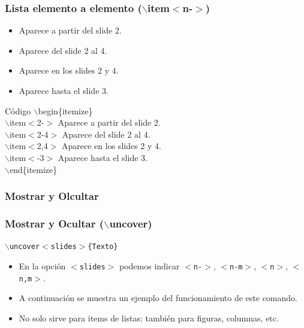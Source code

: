 \documentclass[aspectratio=1610]{beamer}%
\begin{document}
\begin{frame}[fragile]
\frametitle{\textbf{Lista elemento a elemento ($\backslash$item$<$n-$>$)}}
\justifying
 \begin{itemize}
\item<2-> Aparece a partir del slide 2.
 \item<2-4> Aparece del slide 2 al 4. 
 \item<2,4> Aparece en los slides 2 y 4. 
 \item<-3> Aparece hasta el slide 3. 
\end{itemize}  
 
\begin{exampleblock}{Código}
$\backslash$begin\{itemize\}\\
$\backslash$item$<$2-$>$ Aparece a partir del slide 2.\\
 $\backslash$item$<$2-4$>$ Aparece del slide 2 al 4. \\
 $\backslash$item$<$2,4$>$ Aparece en los slides 2 y 4.\\ 
$\backslash$item$<$-3$>$ Aparece hasta el slide 3. \\
$\backslash$end\{itemize\}    
\end{exampleblock}


\end{frame}

\subsubsection{Mostrar y Olcultar}
\begin{frame}[fragile]
\frametitle{\textbf{Mostrar y Ocultar ($\backslash$uncover)}}
\justifying
 \texttt{$\backslash$uncover$<$slides$>$\{Texto\}}
 \begin{itemize}\justifying
  \item En la opción \texttt{$<$slides$>$} podemos indicar \texttt{$<$n-$>$}, \texttt{$<$n-m$>$}, \texttt{$<$n$>$}, \texttt{$<$n,m$>$}.
  \item A continuación se muestra un ejemplo del funcionamiento de este comando.
  \item No solo sirve para items de listas: también para figuras, columnas, etc.
\end{itemize}

\end{frame}
\end{document}
